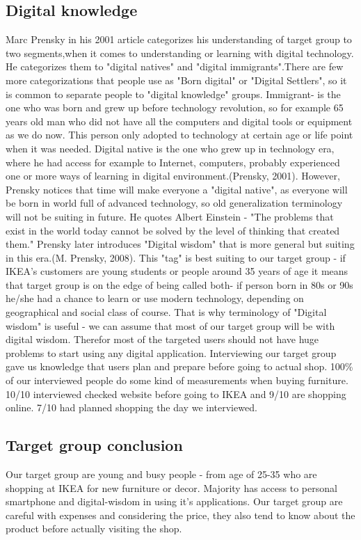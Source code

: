 \subsection{Digital knowledge}
Marc Prensky in his 2001 article categorizes his understanding of target group to two segments,when it comes to understanding or learning with digital technology. He categorizes them to "digital natives" and "digital immigrants".There are few more categorizations that people use as "Born digital" or "Digital Settlers", so it is common to separate people to "digital knowledge" groups.  Immigrant- is the one who was born and grew up before technology revolution, so for example 65 years old man who did not have all the computers and digital tools or equipment as we do now. This person only adopted to technology at certain age or life point when it was needed. Digital native is the one who grew up in technology era, where he had access for example to Internet, computers, probably experienced one or more ways of learning in digital environment.(Prensky, 2001). However, Prensky notices that time will make everyone a "digital native", as everyone will be born in world full of advanced technology, so old generalization terminology will not be suiting in future. He quotes Albert Einstein - "The problems that exist in the world today cannot be solved by the level of thinking that created them." Prensky later introduces "Digital wisdom" that is more general but suiting in this era.(M. Prensky, 2008). This "tag" is best suiting to our target group - if IKEA's customers are young students or people around 35 years of age it means that target group is on the edge of being called both- if person born in 80s or 90s he/she had a chance to learn or use modern technology, depending on geographical and social class of course. That is why terminology of "Digital wisdom" is useful - we can assume that most of our target group will be with digital wisdom. Therefor most of the targeted users should not have huge problems to start using any digital application.
Interviewing our target group gave us knowledge that users plan and prepare before going to actual shop. 100\% of our interviewed people do some kind of measurements when buying furniture. 10/10 interviewed checked website before going to IKEA and 9/10 are shopping online. 7/10 had planned shopping  the day we interviewed.
\subsection{Target group conclusion}
Our target group are young and busy people - from age of 25-35 who are shopping at IKEA for new furniture or decor. Majority has access to personal smartphone and digital-wisdom in using it’s applications. Our target group are careful with expenses and considering the price, they also tend to know about the product before actually visiting the shop. 



